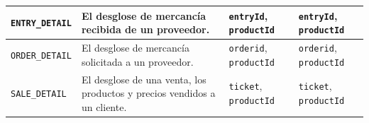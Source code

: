 \documentclass[11pt]{article}
\begin{document}
\begin{table}[h!]
\begin{tabular}{
    | p{3.3cm}
    | p{5.2cm}
    | p{2.8cm}
    | p{2.8cm} |
}
    \midrule
    \texttt{ENTRY\_DETAIL}       & El desglose de mercancía recibida de un proveedor.                                                    & \texttt{entryId}, \texttt{productId}      &  \texttt{entryId}, \texttt{productId} \\
    \midrule
    \texttt{ORDER\_DETAIL}       & El desglose de mercancía solicitada a un proveedor.                                                   & \texttt{orderid}, \texttt{productId}      & \texttt{orderid}, \texttt{productId} \\
    \midrule
    \texttt{SALE\_DETAIL}        & El desglose de una venta, los productos y precios vendidos a un cliente.                              & \texttt{ticket}, \texttt{productId}       & \texttt{ticket}, \texttt{productId} \\
    \bottomrule
\end{tabular}
\end{table}
\vfill
\end{document}
